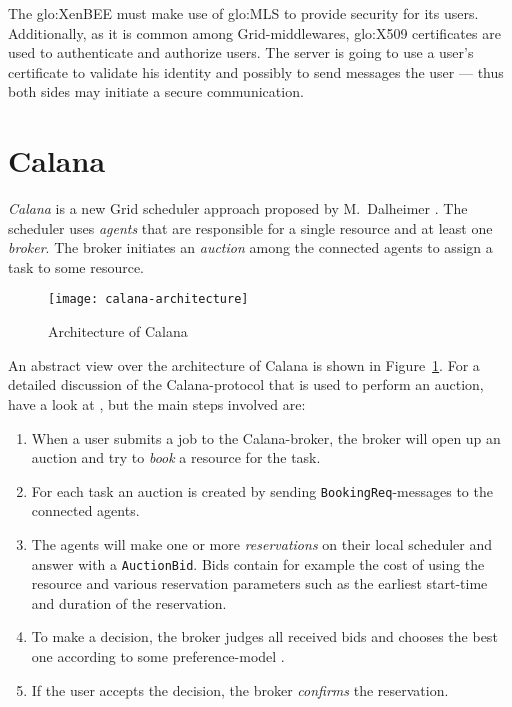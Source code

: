 \bigskip

The \gls{glo:XenBEE}  must make use  of \gls{glo:MLS} to  provide security
for  its users.   Additionally, as  it is  common  among Grid-middlewares,
\gls{glo:X509}  certificates  are   used  to  authenticate  and  authorize
users. The  server is going  to use a  user's certificate to  validate his
identity and  possibly to send messages  the user --- thus  both sides may
initiate a secure communication.

\section{Calana}
\label{sec:calana}

\emph{Calana} is  a new Grid  scheduler approach proposed  by M.~Dalheimer
\cite{dalheimer05agentbased}.  The  scheduler uses \emph{agents}  that are
responsible for  a single  resource and at  least one  \emph{broker}.  The
broker initiates an \emph{auction} among  the connected agents to assign a
task to some resource.

\begin{figure}[htbp]
  \centering
  \texttt{[image: calana-architecture]}
  \caption{Architecture of Calana}
  \label{fig:calana-architecture}
\end{figure}

An  abstract   view  over   the  architecture  of   Calana  is   shown  in
Figure~\ref{fig:calana-architecture}.   For a  detailed discussion  of the
Calana-protocol  that  is used  to  perform an  auction,  have  a look  at
\cite{dalheimer06calanaprotocol,petry06}, but  the  main steps  involved
are:
\begin{enumerate}
\item When a user submits a job to the Calana-broker, the broker will open
  up an auction and try to \emph{book} a resource for the task.
\item    For   each   task    an   auction    is   created    by   sending
  \texttt{BookingReq}-messages to the connected agents.
\item The agents will make  one or more \emph{reservations} on their local
  scheduler  and  answer with  a  \texttt{AuctionBid}.   Bids contain  for
  example  the  cost  of   using  the  resource  and  various  reservation
  parameters  such  as  the   earliest  start-time  and  duration  of  the
  reservation.
\item To make a decision, the  broker judges all received bids and chooses
  the     best     one      according     to     some     preference-model
  \cite{dalheimer05agentbased, petry06}.
\item If  the user  accepts the decision,  the broker  \emph{confirms} the
  reservation.
\end{enumerate}

